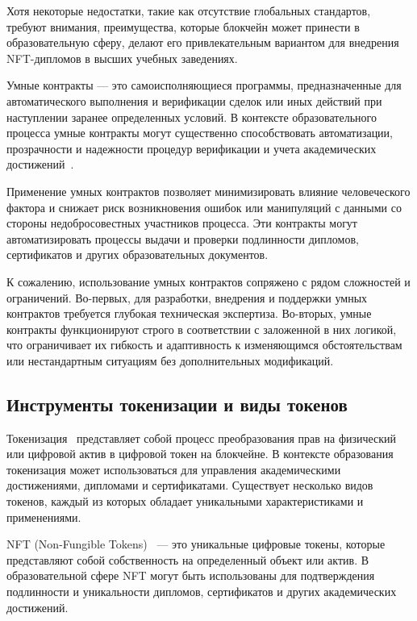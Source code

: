 Хотя некоторые недостатки, такие как отсутствие глобальных стандартов, требуют внимания, преимущества, которые блокчейн может принести в образовательную сферу, делают его привлекательным вариантом для внедрения NFT-дипломов в высших учебных заведениях.

Умные контракты --- это самоисполняющиеся программы, предназначенные для автоматического выполнения и верификации сделок или иных действий при наступлении заранее определенных условий. В контексте образовательного процесса умные контракты могут существенно способствовать автоматизации, прозрачности и надежности процедур верификации и учета академических достижений~\cite{bib:smart_contract}.

Применение умных контрактов позволяет минимизировать влияние человеческого фактора и снижает риск возникновения ошибок или манипуляций с данными со стороны недобросовестных участников процесса. Эти контракты могут автоматизировать процессы выдачи и проверки подлинности дипломов, сертификатов и других образовательных документов.

К сожалению, использование умных контрактов сопряжено с рядом сложностей и ограничений. Во-первых, для разработки, внедрения и поддержки умных контрактов требуется глубокая техническая экспертиза. Во-вторых, умные контракты функционируют строго в соответствии с заложенной в них логикой, что ограничивает их гибкость и адаптивность к изменяющимся обстоятельствам или нестандартным ситуациям без дополнительных модификаций.

\subsection{Инструменты токенизации и виды токенов}

Токенизация~\cite{bib:tokenizer} представляет собой процесс преобразования прав на физический или цифровой актив в цифровой токен на блокчейне. В контексте образования токенизация может использоваться для управления академическими достижениями, дипломами и сертификатами. Существует несколько видов токенов, каждый из которых обладает уникальными характеристиками и применениями.

NFT (Non-Fungible Tokens)~\cite{bib:what_is_nft} --- это уникальные цифровые токены, которые представляют собой собственность на определенный объект или актив. В образовательной сфере NFT могут быть использованы для подтверждения подлинности и уникальности дипломов, сертификатов и других академических достижений.

